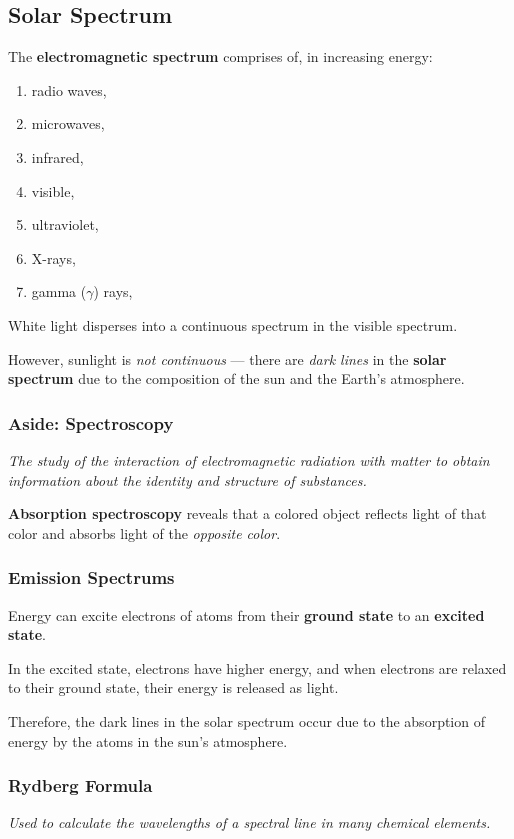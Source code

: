 \subsection{Solar Spectrum}
The \textbf{electromagnetic spectrum} comprises of, in increasing energy:
\begin{enumerate}
    \item radio waves,
    \item microwaves,
    \item infrared,
    \item visible,
    \item ultraviolet,
    \item X-rays,
    \item gamma ($\gamma$) rays,
\end{enumerate}

White light disperses into a continuous spectrum in the visible spectrum.

However, sunlight is \emph{not continuous} --- there are \emph{dark lines} in
the \textbf{solar spectrum} due to the composition of the sun and the Earth's atmosphere.

\subsubsection{Aside: Spectroscopy}

\emph{The study of the interaction of \emph{electromagnetic radiation}
with \emph{matter} to obtain information about the identity and structure of substances.}

\textbf{Absorption spectroscopy} reveals that a colored object reflects light of that color
and absorbs light of the \textit{opposite color}.

\subsubsection{Emission Spectrums}
Energy can excite electrons of atoms from their \textbf{ground state} to an \textbf{excited state}.

In the excited state, electrons have higher energy, and when electrons are relaxed to their
ground state, their energy is released as light.

Therefore, the dark lines in the solar spectrum occur due to the absorption of energy
by the atoms in the sun's atmosphere.

\subsubsection{Rydberg Formula}
\emph{Used to calculate the wavelengths of a spectral line in many chemical elements.}

